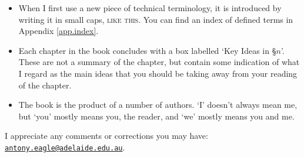 \documentclass[twoside, openany, 11pt, a4paper]{memoir}
\begin{document}
\begin{itemize}
	\item When I first use a new piece of technical terminology, it is introduced by writing it in small caps, \textsc{like this}. You can find an index of defined terms in Appendix \ref{app.index}.
	\item Each chapter in the book concludes with a box labelled `Key Ideas in §$n$'. These are not a summary of the chapter, but contain some indication of what I regard as the main ideas that you should be taking away from your reading of the chapter. 
	\item The book is the product of a number of authors. `I' doesn't always mean me, but `you' mostly means you, the reader, and `we' mostly means you and me.
\end{itemize}
I appreciate any comments or corrections you may have: \href{mailto:antony.eagle@adelaide.edu.au}{\nolinkurl{antony.eagle@adelaide.edu.au}}.

\mainmatter








\appendix %




\renewcommand{\indexname}{Index of defined terms}\printindex %

\end{document}
